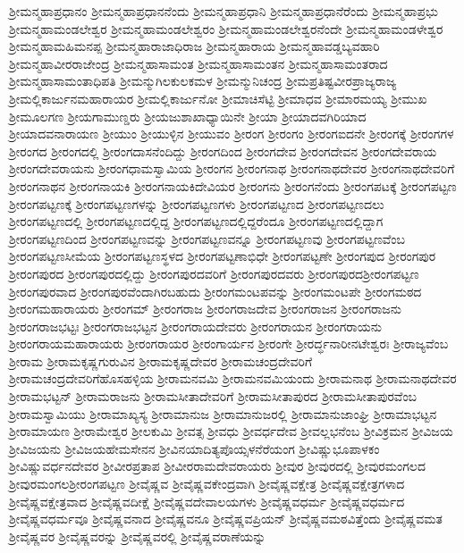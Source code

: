 {ಶ್ರೀಮನ್ಮಹಾಪ್ರಧಾನಂ
ಶ್ರೀಮನ್ಮಹಾಪ್ರಧಾನನೆಂದು
ಶ್ರೀಮನ್ಮಹಾಪ್ರಧಾನಿ
ಶ್ರೀಮನ್ಮಹಾಪ್ರಧಾನೆರೆಂದು
ಶ್ರೀಮನ್ಮಹಾಪ್ರಭು
ಶ್ರೀಮನ್ಮಹಾಮಂಡಲೇಶ್ವರ
ಶ್ರೀಮನ್ಮಹಾಮಂಡಲೇಶ್ವರಂ
ಶ್ರೀಮನ್ಮಹಾಮಂಡಲೇಶ್ವರನೆಂದೇ
ಶ್ರೀಮನ್ಮಹಾಮಂಡಳೇಶ್ವರ
ಶ್ರೀಮನ್ಮಹಾಮಹಿಮನಪ್ಪ
ಶ್ರೀಮನ್ಮಹಾರಾಜಾಧಿರಾಜ
ಶ್ರೀಮನ್ಮಹಾರಾಯ
ಶ್ರೀಮನ್ಮಹಾವಡ್ಡಬ್ಯವಹಾರಿ
ಶ್ರೀಮನ್ಮಹಾವೀರರಾಜೇಂದ್ರ
ಶ್ರೀಮನ್ಮಹಾಸಾಮಂತ
ಶ್ರೀಮನ್ಮಹಾಸಾಮಂತನ
ಶ್ರೀಮನ್ಮಹಾಸಾಮಂತರಾದ
ಶ್ರೀಮನ್ಮಹಾಸಾಮಂತಾಧಿಪತಿ
ಶ್ರೀಮನ್ಮುಗಿಲಕುಲಕಮಳ
ಶ್ರೀಮನ್ಮುನಿಚಂದ್ರ
ಶ್ರೀಮಪ್ರತಿಷ್ಟವೀರಪ್ರಾಜ್ಯರಾಜ್ಯ
ಶ್ರೀಮಲ್ಲಿಕಾರ್ಜುನಮಹಾರಾಯರ
ಶ್ರೀಮಲ್ಲಿಕಾರ್ಜುನೋ
ಶ್ರೀಮಾಚಿಸೆಟ್ಟಿ
ಶ್ರೀಮಾಧವ
ಶ್ರೀಮಾರಮಯ್ಯ
ಶ್ರೀಮುಖ
ಶ್ರೀಮೂಲಗಣ
ಶ್ರೀಯಗಾಮುಣ್ಡರು
ಶ್ರೀಯಜುಶಾಖಾಧ್ಯಾಯಿನೇ
ಶ್ರೀಯಾ
ಶ್ರೀಯಾದವಗಿರಿಯಾದ
ಶ್ರೀಯಾದವನಾರಾಯಣ
ಶ್ರೀಯುಂ
ಶ್ರೀಯುಳ್ಳಿನ
ಶ್ರೀಯುವಂ
ಶ್ರೀರಂಗ
ಶ್ರೀರಂಗಂ
ಶ್ರೀರಂಗಐದನೇ
ಶ್ರೀರಂಗಕ್ಕೆ
ಶ್ರೀರಂಗಗಳ
ಶ್ರೀರಂಗದ
ಶ್ರೀರಂಗದಲ್ಲಿ
ಶ್ರೀರಂಗದಾಸನೆಂದಿದ್ದು
ಶ್ರೀರಂಗದಿಂದ
ಶ್ರೀರಂಗದೇವ
ಶ್ರೀರಂಗದೇವನ
ಶ್ರೀರಂಗದೇವರಾಯ
ಶ್ರೀರಂಗದೇವರಾಯನು
ಶ್ರೀರಂಗಧಾಮಸ್ವಾಮಿಯ
ಶ್ರೀರಂಗನ
ಶ್ರೀರಂಗನಾಥ
ಶ್ರೀರಂಗನಾಥದೇವರ
ಶ್ರೀರಂಗನಾಥದೇವರಿಗೆ
ಶ್ರೀರಂಗನಾಥನ
ಶ್ರೀರಂಗನಾಯಕಿ
ಶ್ರೀರಂಗನಾಯಕಿದೇವಿಯರ
ಶ್ರೀರಂಗನು
ಶ್ರೀರಂಗನೆಂದು
ಶ್ರೀರಂಗಪಟಕ್ಕೆ
ಶ್ರೀರಂಗಪಟ್ಟಣ
ಶ್ರೀರಂಗಪಟ್ಟಣಕ್ಕೆ
ಶ್ರೀರಂಗಪಟ್ಟಣಗಳನ್ನು
ಶ್ರೀರಂಗಪಟ್ಟಣಗಳು
ಶ್ರೀರಂಗಪಟ್ಟಣದ
ಶ್ರೀರಂಗಪಟ್ಟಣದಲು
ಶ್ರೀರಂಗಪಟ್ಟಣದಲ್ಲಿ
ಶ್ರೀರಂಗಪಟ್ಟಣದಲ್ಲಿದ್ದ
ಶ್ರೀರಂಗಪಟ್ಟಣದಲ್ಲಿದ್ದರೆಂದೂ
ಶ್ರೀರಂಗಪಟ್ಟಣದಲ್ಲಿದ್ದಾಗ
ಶ್ರೀರಂಗಪಟ್ಟಣದಿಂದ
ಶ್ರೀರಂಗಪಟ್ಟಣವನ್ನು
ಶ್ರೀರಂಗಪಟ್ಟಣವನ್ನೂ
ಶ್ರೀರಂಗಪಟ್ಟಣವು
ಶ್ರೀರಂಗಪಟ್ಟಣವೆಂಬ
ಶ್ರೀರಂಗಪಟ್ಟಣಸೀಮೆಯ
ಶ್ರೀರಂಗಪಟ್ಟಣಸ್ಥಳದ
ಶ್ರೀರಂಗಪಟ್ಟಣಾಭಿಧೇ
ಶ್ರೀರಂಗಪಟ್ಟಣೇ
ಶ್ರೀರಂಗಪುದ
ಶ್ರೀರಂಗಪುರ
ಶ್ರೀರಂಗಪುರದ
ಶ್ರೀರಂಗಪುರದಲ್ಲಿದ್ದು
ಶ್ರೀರಂಗಪುರದವರಿಗೆ
ಶ್ರೀರಂಗಪುರದವರು
ಶ್ರೀರಂಗಪುರದಶ್ರೀರಂಗಪಟ್ಟಣ
ಶ್ರೀರಂಗಪುರವಾದ
ಶ್ರೀರಂಗಪುರವೆಂದಾಗಿರಬಹುದು
ಶ್ರೀರಂಗಮಂಟಪವನ್ನು
ಶ್ರೀರಂಗಮಂಟಪೇ
ಶ್ರೀರಂಗಮಠದ
ಶ್ರೀರಂಗಮಹಾರಾಯರು
ಶ್ರೀರಂಗಮ್
ಶ್ರೀರಂಗರಾಜ
ಶ್ರೀರಂಗರಾಜದೇವ
ಶ್ರೀರಂಗರಾಜನ
ಶ್ರೀರಂಗರಾಜನು
ಶ್ರೀರಂಗರಾಜಭಟ್ಟಃ
ಶ್ರೀರಂಗರಾಜಭಟ್ಟನ
ಶ್ರೀರಂಗರಾಯದೇವರು
ಶ್ರೀರಂಗರಾಯನ
ಶ್ರೀರಂಗರಾಯನು
ಶ್ರೀರಂಗರಾಯಮಹಾರಾಯರು
ಶ್ರೀರಂಗರಾಯರ
ಶ್ರೀರಂಗಾರ್ಯನ
ಶ್ರೀರಂಗೇ
ಶ್ರೀರರ್ದ್ಧನಾರೀನಟೇಶ್ವರಃ
ಶ್ರೀರಾಜ್ಯವೆಂಬ
ಶ್ರೀರಾಮ
ಶ್ರೀರಾಮಕೃಷ್ಣಗುರುವಿನ
ಶ್ರೀರಾಮಕೃಷ್ಣದೇವರ
ಶ್ರೀರಾಮಚಂದ್ರದೇವರಿಗೆ
ಶ್ರೀರಾಮಚಂದ್ರದೇವರಿಗೆಹೊಸಹಳ್ಳಿಯ
ಶ್ರೀರಾಮನವಮಿ
ಶ್ರೀರಾಮನವಮಿಯಂದು
ಶ್ರೀರಾಮನಾಥ
ಶ್ರೀರಾಮನಾಥದೇವರ
ಶ್ರೀರಾಮಭಟ್ಟನ್
ಶ್ರೀರಾಮರಾಜನು
ಶ್ರೀರಾಮಸೀತಾದೇವರಿಗೆ
ಶ್ರೀರಾಮಸೀತಾಪುರದ
ಶ್ರೀರಾಮಸೀತಾಪುರವೆಂಬ
ಶ್ರೀರಾಮಸ್ವಾಮಿಯು
ಶ್ರೀರಾಮಾಖ್ಯಸ್ಯ
ಶ್ರೀರಾಮಾನುಜ
ಶ್ರೀರಾಮಾನುಜರಲ್ಲಿ
ಶ್ರೀರಾಮಾನುಜಾಂಘ್ರಿ
ಶ್ರೀರಾಮಾಭಟ್ಟನ
ಶ್ರೀರಾಮಾಯಣ
ಶ್ರೀರಾಮೇಶ್ವರ
ಶ್ರೀಲಕುಮಿ
ಶ್ರೀವತ್ಸ
ಶ್ರೀವಧು
ಶ್ರೀವರ್ಧದೇವ
ಶ್ರೀವಲ್ಲಭನೆಂಬ
ಶ್ರೀವಿಕ್ರಮನ
ಶ್ರೀವಿಜಯ
ಶ್ರೀವಿಜಯನು
ಶ್ರೀವಿಜಯಹೇಮಸೇನನ
ಶ್ರೀವಿನಯಾದಿತ್ಯಪೊಯ್ಸಳನೆರೆಯಂಗ
ಶ್ರೀವಿಷ್ಣುಭೂಪಾಳಕಂ
ಶ್ರೀವಿಷ್ಣುವರ್ಧನದೇವರ
ಶ್ರೀವೀರಪ್ರತಾಪ
ಶ್ರೀವೀರರಾಮದೇವರಾಯರು
ಶ್ರೀವುರ
ಶ್ರೀವುರದಲ್ಲಿ
ಶ್ರೀವುರಮಂಗಲದ
ಶ್ರೀವುರಮಂಗಲಶ್ರೀರಂಗಪಟ್ಟಣ
ಶ್ರೀವೈಷ್ಣವ
ಶ್ರೀವೈಷ್ಣವಕೇಂದ್ರವಾಗಿ
ಶ್ರೀವೈಷ್ಣವಕ್ಷೇತ್ರ
ಶ್ರೀವೈಷ್ಣವಕ್ಷೇತ್ರಗಳಾದ
ಶ್ರೀವೈಷ್ಣವಕ್ಷೇತ್ರವಾದ
ಶ್ರೀವೈಷ್ಣವದೀಕ್ಷೆ
ಶ್ರೀವೈಷ್ಣವದೇವಾಲಯಗಳು
ಶ್ರೀವೈಷ್ಣವಧರ್ಮ
ಶ್ರೀವೈಷ್ಣವಧರ್ಮದ
ಶ್ರೀವೈಷ್ಣವಧರ್ಮವೂ
ಶ್ರೀವೈಷ್ಣವನಾದ
ಶ್ರೀವೈಷ್ಣವನೂ
ಶ್ರೀವೈಷ್ಣವಪ್ರಿಯನ್
ಶ್ರೀವೈಷ್ಣವಮಠವಿತ್ತೆಂದು
ಶ್ರೀವೈಷ್ಣವಮತ
ಶ್ರೀವೈಷ್ಣವರ
ಶ್ರೀವೈಷ್ಣವರನ್ನು
ಶ್ರೀವೈಷ್ಣವರಲ್ಲಿ
ಶ್ರೀವೈಷ್ಣವರಾಣೆಯನ್ನು
}

